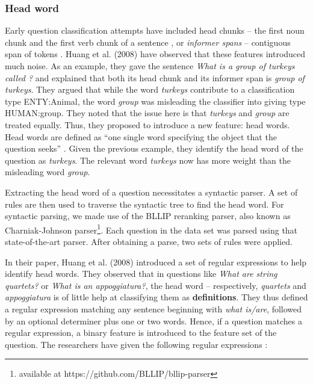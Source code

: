 \documentclass[11pt]{article}
\begin{document}
\subsubsection{Head word} Early question classification attempts have included head chunks -- the first noun chunk and the first verb chunk of a sentence \cite{li}, or \textit{informer spans} -- contiguous span of tokens \cite{huang}. Huang et al. (2008) have observed that these features introduced much noise. As an example, they gave the sentence \textit{What is a group of turkeys called ?} and explained that both its head chunk and its informer span is \textit{group of turkeys}. They argued that while the word \textit{turkeys} contribute to a classification type ENTY:Animal, the word \textit{group} was misleading the classifier into giving type HUMAN:group. They noted that the issue here is that \textit{turkeys} and \textit{group} are treated equally. Thus, they proposed to introduce a new feature: head words. Head words are defined as ``one single word specifying the object that the question seeks'' \cite{huang}. Given the previous example, they identify the head word of the question as \textit{turkeys}. The relevant word \textit{turkeys} now has more weight than the misleading word \textit{group}.

Extracting the head word of a question necessitates a syntactic parser. A set of rules are then used to traverse the syntactic tree to find the head word. For syntactic parsing, we made use of the BLLIP reranking parser, also known as Charniak-Johnson parser\footnote{available at https://github.com/BLLIP/bllip-parser}. Each question in the data set was parsed using that state-of-the-art parser. After obtaining a parse, two sets of rules were applied. 

In their paper, Huang et al. (2008) introduced a set of regular expressions to help identify head words. They observed that in questions like \textit{What are string quartets?} or \textit{What is an appoggiatura?}, the head word -- respectively, \textit{quartets} and \textit{appoggiatura} is of little help at classifying them as \textbf{definitions}. They thus defined a regular expression matching any sentence beginning with \textit{what is/are}, followed by an optional determiner plus one or two words. Hence, if a question matches a regular expression, a binary feature is introduced to the feature set of the question. The researchers have given the following regular expressions \cite{huang}:\\
\end{document}
